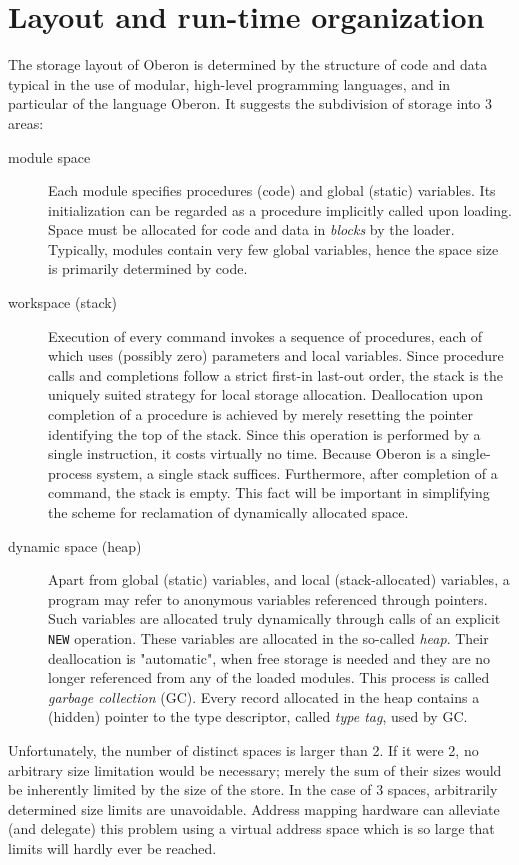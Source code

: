 \section{Layout and run-time organization}
The storage layout of Oberon is determined by the structure of code and data typical in the
use of modular, high-level programming languages, and in particular of the language Oberon.
It suggests the subdivision of storage into 3 areas:
\begin{description}
  \item[module space] Each module specifies procedures (code) and global (static) variables.
    Its initialization can be regarded as a procedure implicitly called upon loading. Space
    must be allocated for code and data in \emph{blocks} by the loader. Typically, modules
    contain very few global variables, hence the space size is primarily determined by code.
  \item[workspace (stack)] Execution of every command invokes a sequence of procedures, each
    of which uses (possibly zero) parameters and local variables. Since procedure calls and
    completions follow a strict first-in last-out order, the stack is the uniquely suited
    strategy for local storage allocation. Deallocation upon completion of a procedure is
    achieved by merely resetting the pointer identifying the top of the stack. Since this
    operation is performed by a single instruction, it costs virtually no time. Because
    Oberon is a single-process system, a single stack suffices. Furthermore, after completion
    of a command, the stack is empty. This fact will be important in simplifying the scheme
    for reclamation of dynamically allocated space.
  \item[dynamic space (heap)] Apart from global (static) variables, and local (stack-allocated)
    variables, a program may refer to anonymous variables referenced through pointers. Such
    variables are allocated truly dynamically through calls of an explicit \verb|NEW| operation.
    These variables are allocated in the so-called \emph{heap}. Their deallocation is "automatic",
    when free storage is needed and they are no longer referenced from any of the loaded modules.
    This process is called \emph{garbage collection} (GC). Every record allocated in the heap
    contains a (hidden) pointer to the type descriptor, called \emph{type tag}, used by GC.
\end{description}
Unfortunately, the number of distinct spaces is larger than 2. If it were 2, no arbitrary
size limitation would be necessary; merely the sum of their sizes would be inherently limited
by the size of the store. In the case of 3 spaces, arbitrarily determined size limits are
unavoidable. Address mapping hardware can alleviate (and delegate) this problem using a
virtual address space which is so large that limits will hardly ever be reached.

